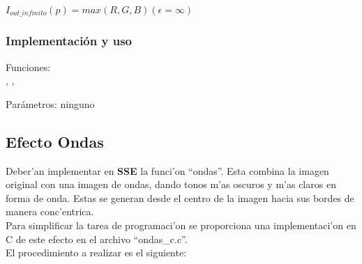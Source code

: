 
\begin{center}
  $I_{out\_infinito}(p) = max(R, G, B) (\epsilon = \infty)$
\end{center}


\subsubsection*{Implementación y uso}
\noindent Funciones: \\
, ,
 
\noindent Parámetros: ninguno




\subsection{Efecto Ondas}

Deber'an implementar en \textbf{SSE} la funci'on ``ondas''. Esta combina la 
imagen original con una imagen de ondas, dando tonos m'as oscuros y m'as claros 
en forma de onda. Estas se generan desde el centro de la imagen hacia 
sus bordes de manera conc'entrica.\\

Para simplificar la tarea de programaci'on se proporciona una implementaci'on 
en C de este efecto en el archivo ``ondas\_c.c''.\\

El procedimiento a realizar es el siguiente:

